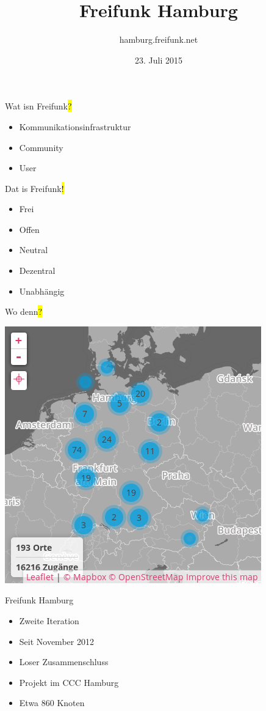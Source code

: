 \documentclass[t]{beamer}
\title{Freifunk Hamburg}
\author{hamburg.freifunk.net}
\date{23. Juli 2015}
\begin{document}
\maketitle

\begin{frame}{Wat isn Freifunk\hl{?}}
    \begin{itemize}
        \item Kommunikationsinfrastruktur
        \item Community
        \item User
    \end{itemize}
\end{frame}

\begin{frame}{Dat is Freifunk\hl{!}}
    \begin{itemize}
        \item Frei
        \item Offen
        \item Neutral
        \item Dezentral
        \item Unabhängig
    \end{itemize}
\end{frame}

\begin{frame}{Wo denn\hl{?}}
    \begin{center}
        \includegraphics[width=.5\textwidth]{Bilder/community-map-2015-07-20}
    \end{center}
\end{frame}

\begin{frame}{Freifunk Hamburg\ANKER{}}
    \begin{itemize}
        \item Zweite Iteration
        \item Seit November 2012
        \item Loser Zusammenschluss
        \item Projekt im CCC Hamburg
        \item Etwa 860 Knoten
    \end{itemize}
\end{frame}
\end{document}
